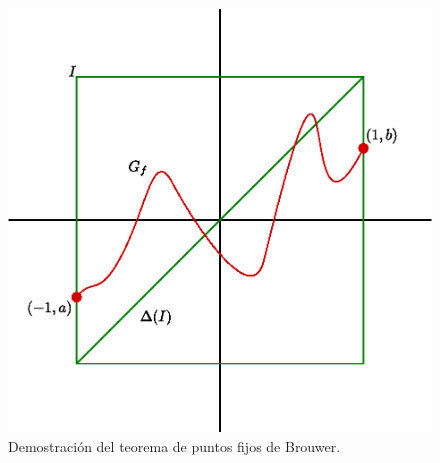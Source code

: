 \begin{figure}[h]
    \centering
    \includegraphics[scale=0.8]{Figures/brouwers_thm_1.eps}
    \caption{Demostraci\'on del teorema de puntos fijos de Brouwer.}
    \label{fig_1}
\end{figure}

